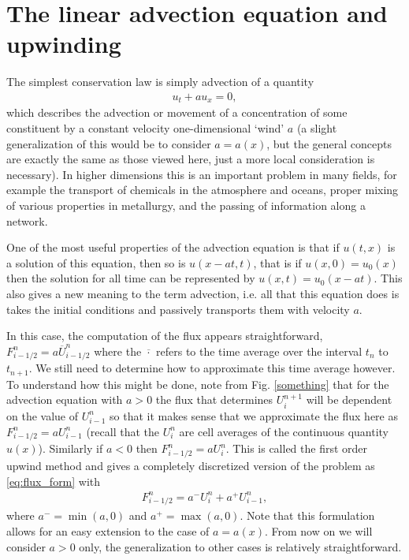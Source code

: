 \section{The linear advection equation and upwinding}
The simplest conservation law is simply advection of a quantity
\begin{gather}
u_t + au_x = 0,
\end{gather}
which describes the advection or movement of a concentration of some constituent by a constant velocity one-dimensional `wind' $a$ (a slight generalization of this would be to consider $a=a(x)$, but the general concepts are exactly the same as those viewed here, just a more local consideration is necessary).  In higher dimensions this is an important problem in many fields, for example the transport of chemicals in the atmosphere and oceans, proper mixing of various properties in metallurgy, and the passing of information along a network.

One of the most useful properties of the advection equation is that if $u(t,x)$ is a solution of this equation, then so is $u(x-at,t)$, that is if $u(x,0) = u_0(x)$ then the solution for all time can be represented by $u(x,t) = u_0(x-at)$.  This also gives a new meaning to the term advection, i.e. all that this equation does is takes the initial conditions and passively transports them with velocity $a$.

In this case, the computation of the flux appears straightforward, $F_{i-1/2}^n = a\overline{U}^n_{i-1/2}$ where the $\overline{\cdot}$ refers to the time average over the interval $t_n$ to $t_{n+1}$.  We still need to determine how to approximate this time average however.  To understand how this might be done, note from Fig. \ref{something} that for the advection equation with $a>0$ the flux that determines $U_i^{n+1}$ will be dependent on the value of $U_{i-1}^n$ so that it makes sense that we approximate the flux here as $F_{i-1/2}^n = aU_{i-1}^n$ (recall that the $U_i^n$ are cell averages of the continuous quantity $u(x)$).  Similarly if $a<0$ then $F_{i-1/2}^n = aU_{i}^n$.  This is called the first order upwind method and gives a completely discretized version of the problem as \eqref{eq:flux_form} with
\begin{gather}
F_{i-1/2}^n = a^- U_i^n + a^+U_{i-1}^n,
\end{gather}
where $a^- = \min (a,0)$ and $a^+ = \max (a,0)$.  Note that this formulation allows for an easy extension to the case of $a=a(x)$.  From now on we will consider $a>0$ only, the generalization to other cases is relatively straightforward.

